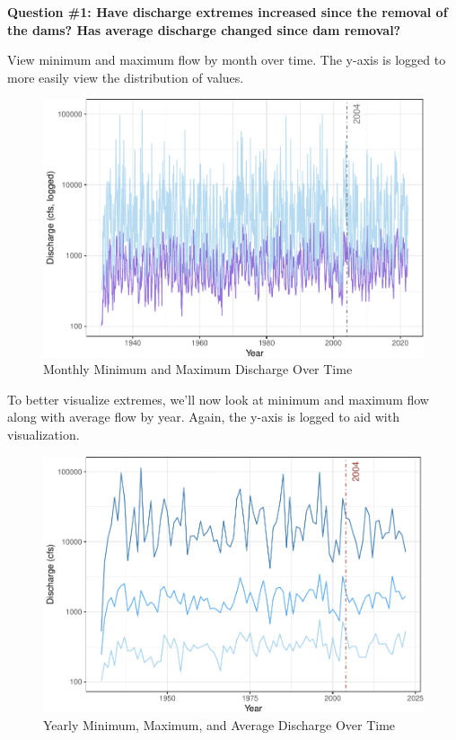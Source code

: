 \documentclass[
  12pt,
]{article}
\begin{document}
\textbf{Question \#1: Have discharge extremes increased since the
removal of the dams? Has average discharge changed since dam removal?}

View minimum and maximum flow by month over time. The y-axis is logged
to more easily view the distribution of values.

\begin{figure}
\centering
\includegraphics{Project_Script_files/figure-latex/Flow.analysis-1.pdf}
\caption{Monthly Minimum and Maximum Discharge Over Time}
\end{figure}

To better visualize extremes, we'll now look at minimum and maximum flow
along with average flow by year. Again, the y-axis is logged to aid with
visualization.

\begin{figure}
\centering
\includegraphics{Project_Script_files/figure-latex/Flow.analysis1-1.pdf}
\caption{Yearly Minimum, Maximum, and Average Discharge Over Time}
\end{figure}
\end{document}
